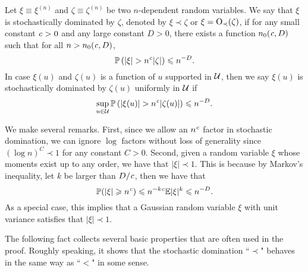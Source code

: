 \begin{definition}\label{stoch_domination}
Let $\xi\equiv \xi^{(n)}$ and $\zeta\equiv \zeta^{(n)}$ be two $n$-dependent random variables.
We say that $\xi$ is stochastically dominated by $\zeta$, denoted by $\xi\prec \zeta$ or $\xi=\OO_\prec(\zeta)$, if for any small constant $\e > 0$ and any large constant $D > 0$, there exists a function $n_0(\e, D)$ such that for all $n > n_0(\e, D)$,
\[ \bbP\left(|\xi| >n^\e |\zeta|\right)\le n^{-D}. \]
In case $\xi(u)$ and $\zeta(u)$ is a function of $u$ supported in $\cal U$, then we say $\xi(u)$ is stochastically dominated by $\zeta(u)$ uniformly in $\cal U$ if %
\[ \sup_{u\in \cal U}\bbP\left(|\xi(u)|>n^\e |\zeta(u)|\right)\le n^{-D}. \]
\end{definition}

We make several remarks.
First, since we allow an $n^\e$ factor in stochastic domination, we can ignore $\log$ factors without loss of generality since $(\log n)^C\prec 1$ for any constant $C>0$.
Second, given a random variable $\xi$ whose moments exist up to any order, we have that $|\xi|\prec 1$.
This is because by Markov's inequality, let $k$ be larger than $D/ \e$, then we have that
$$ \P(|\xi|\ge n^{\e})\le n^{-k\e}{\E |\xi|^k}\le n^{-D}.$$
As a special case, this implies that a Gaussian random variable $\xi$ with unit variance satisfies that $|\xi|\prec 1$.

The following fact collects several basic properties that are often used in the proof. Roughly speaking, it shows that  the stochastic domination ``$\prec$" behaves in the same way as  ``$<$" in some sense.

